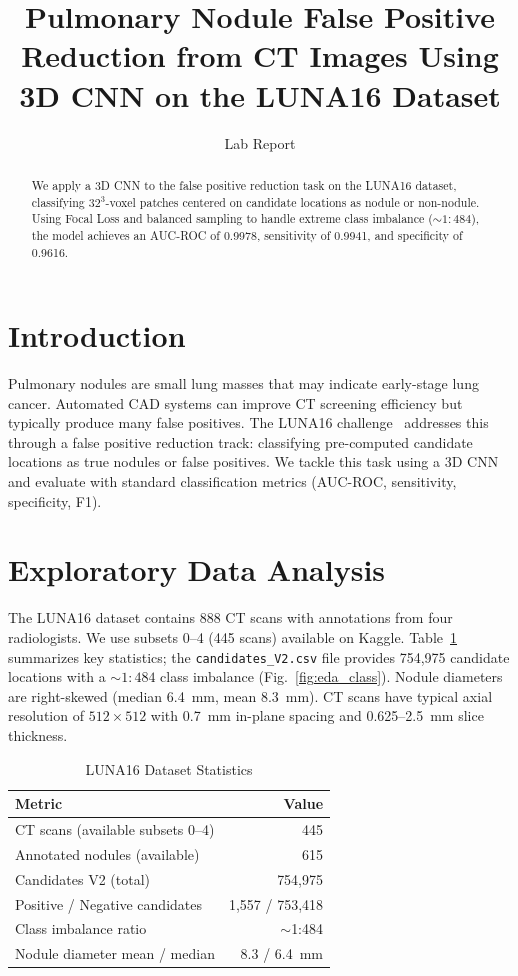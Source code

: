 \documentclass[conference]{IEEEtran}
\title{Pulmonary Nodule False Positive Reduction from CT Images Using 3D CNN on the LUNA16 Dataset}
\author{Lab Report}
\begin{document}
\maketitle

\begin{abstract}
We apply a 3D CNN to the false positive reduction task on the LUNA16 dataset, classifying $32^3$-voxel patches centered on candidate locations as nodule or non-nodule. Using Focal Loss and balanced sampling to handle extreme class imbalance (${\sim}1{:}484$), the model achieves an AUC-ROC of 0.9978, sensitivity of 0.9941, and specificity of 0.9616.
\end{abstract}

\section{Introduction}
Pulmonary nodules are small lung masses that may indicate early-stage lung cancer. Automated CAD systems can improve CT screening efficiency but typically produce many false positives. The LUNA16 challenge~\cite{setio2017validation} addresses this through a false positive reduction track: classifying pre-computed candidate locations as true nodules or false positives. We tackle this task using a 3D CNN and evaluate with standard classification metrics (AUC-ROC, sensitivity, specificity, F1).

\section{Exploratory Data Analysis}

The LUNA16 dataset contains 888 CT scans with annotations from four radiologists. We use subsets 0--4 (445 scans) available on Kaggle. Table~\ref{tab:stats} summarizes key statistics; the \texttt{candidates\_V2.csv} file provides 754,975 candidate locations with a ${\sim}1{:}484$ class imbalance (Fig.~\ref{fig:eda_class}). Nodule diameters are right-skewed (median 6.4~mm, mean 8.3~mm). CT scans have typical axial resolution of $512 \times 512$ with 0.7~mm in-plane spacing and 0.625--2.5~mm slice thickness.

\begin{table}[h]
\centering
\caption{LUNA16 Dataset Statistics}
\label{tab:stats}
\begin{tabular}{@{}lr@{}}
\toprule
Metric & Value \\ \midrule
CT scans (available subsets 0--4) & 445 \\
Annotated nodules (available) & 615 \\
Candidates V2 (total) & 754,975 \\
Positive / Negative candidates & 1,557 / 753,418 \\
Class imbalance ratio & $\sim$1:484 \\
Nodule diameter mean / median & 8.3 / 6.4~mm \\
\bottomrule
\end{tabular}
\end{table}
\end{document}
